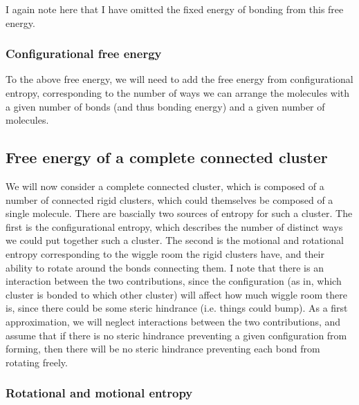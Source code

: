 \documentclass[letterpaper,twocolumn,amsmath,amssymb,pre]{revtex4-1}
\begin{document}
I again note here that I have omitted the fixed energy of bonding from
this free energy.

\subsubsection{Configurational free energy}
To the above free energy, we will need to add the free energy from
configurational entropy, corresponding to the number of ways we can
arrange the molecules with a given number of bonds (and thus bonding
energy) and a given number of molecules.

\subsection{Free energy of a complete connected cluster}

We will now consider a complete connected cluster, which is composed
of a number of connected rigid clusters, which could themselves be
composed of a single molecule.  There are bascially two sources of
entropy for such a cluster.  The first is the configurational entropy,
which describes the number of distinct ways we could put together such
a cluster.  The second is the motional and rotational entropy
corresponding to the wiggle room the rigid clusters have, and their
ability to rotate around the bonds connecting them.  I note that there
is an interaction between the two contributions, since the
configuration (as in, which cluster is bonded to which other cluster)
will affect how much wiggle room there is, since there could be some
steric hindrance (i.e. things could bump).  As a first approximation,
we will neglect interactions between the two contributions, and assume
that if there is no steric hindrance preventing a given configuration
from forming, then there will be no steric hindrance preventing each
bond from rotating freely.

\subsubsection{Rotational and motional entropy}
\end{document}
